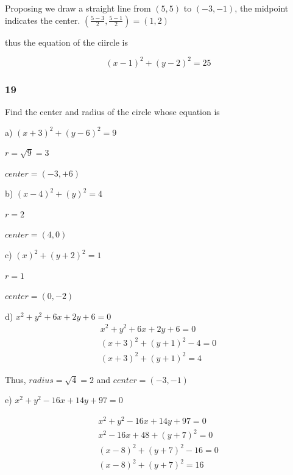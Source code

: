 \documentclass[]{report}
\begin{document}
Proposing we draw a straight line from $(5, 5)$ to $(-3, -1)$, the midpoint indicates the center.
$(\frac{5-3}{2}, \frac{5-1}{2}) = (1, 2)$


thus the equation of the ciircle is 

\[
(x-1)^2 + (y-2)^2 = 25
\]

\subsubsection{19}

Find the center and radius of the circle whose equation is

a) $(x + 3)^2 + (y - 6) ^2 = 9$

$r = \sqrt{9} = 3$

$center = (-3, +6)$


b) $(x - 4)^2 + (y) ^2 = 4$

$r = 2$

$center = (4, 0)$


c) $(x )^2 + (y + 2) ^2 = 1$

$r = 1$

$center = (0, -2)$


d) $x^2 + y^2 + 6x + 2y + 6  = 0$
\begin{align*}
	x^2 + y^2 + 6x + 2y + 6  = 0 \tag{1} \\
	(x + 3)^2 + (y+1)^2  -4 = 0  \tag{factoring out x and y} \\
	(x + 3)^2 + (y+1)^2 = 4
\end{align*}

Thus, $radius = \sqrt{4} = 2$ and $center = (-3, -1)$

e) $x^2 + y^2 - 16x + 14y + 97 = 0$

\begin{align*}
x^2 + y^2 - 16x + 14y + 97 = 0	\tag{1} \\
x^2 - 16x + 48 + (y + 7)^2 = 0 \tag{factoring out y}\\
(x-8)^2 + (y+7)^2 - 16 = 0 \tag{factoring out x} \\
(x-8)^2 + (y+7)^2 = 16
\end{align*}
\end{document}
